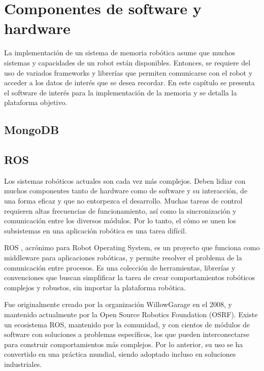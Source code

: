 \section{Componentes de software y hardware}
La implementación de un sistema de memoria robótica asume que muchos sistemas y capacidades de un robot están disponibles. Entonces, se requiere del uso de variados frameworks y librerías que permiten comunicarse con el robot y acceder a los datos de interés que se desea recordar. En este capítulo se presenta el software de interés para la implementación de la memoria y se detalla la plataforma objetivo.

\subsection{MongoDB}

\subsection{ROS}


Los sistemas robóticos actuales son cada vez más complejos. Deben lidiar con muchos componentes tanto de hardware como de software y su interacción, de una forma eficaz y que no entorpezca el desarrollo. Muchas tareas de control requieren altas frecuencias de funcionamiento, así como la sincronización y comunicación entre los diversos módulos. Por lo tanto, el cómo se unen los subsistemas en una aplicación robótica es una tarea difícil.

ROS \cite{ROS:2009}, acrónimo para Robot Operating System, es un proyecto que funciona como middleware para aplicaciones robóticas, y permite resolver el problema de la comunicación entre procesos. Es una colección de herramientas, librerías y convenciones que buscan simplificar la tarea de crear comportamientos robóticos complejos y robustos, sin importar la plataforma robótica.

Fue originalmente creado por la organización WillowGarage en el 2008, y mantenido actualmente por la Open Source Robotics Foundation (OSRF). Existe un ecosistema ROS, mantenido por la comunidad, y con cientos de módulos de software con soluciones a problemas específicos, los que pueden interconectarse para construir comportamientos más complejos. Por lo anterior, su uso se ha convertido en una práctica mundial, siendo adoptado incluso en soluciones industriales.

